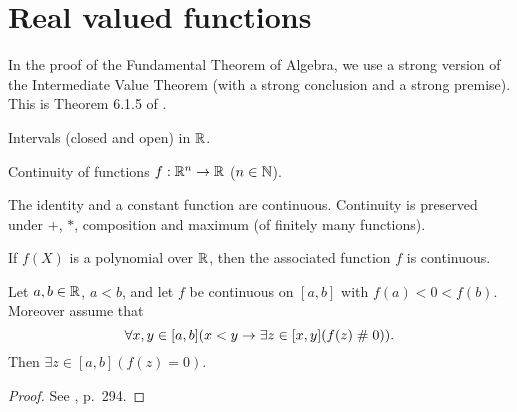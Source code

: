 
\section{Real valued functions}
In the proof of the Fundamental Theorem of Algebra, we use a
strong version of the Intermediate Value Theorem (with a
strong conclusion and a strong premise). This is Theorem 6.1.5 of
\cite{TvD881}.

\begin{definition} Intervals (closed and open) in $\mathbb{R}$.
\end{definition}

\begin{definition} Continuity of functions $f:\mathbb{R}^n\rightarrow \mathbb{R}$
($n\in\mathbb{N}$).
\end{definition}

\begin{lemma}
The identity and a constant function are continuous. 
Continuity is preserved under $+$, $*$, composition and maximum
(of finitely many functions).
\end{lemma}

\begin{corollary} If $f(X)$ is a polynomial over $\mathbb{R}$, then the
associated function $f$ is continuous.
\end{corollary}

\begin{theorem}\label{thmIVT}
Let $a,b\in \mathbb{R}$, $a<b$, and let $f$ be continuous on $[a,b]$ with
$f(a)<0<f(b)$.  Moreover assume that
$$\forall x,y\in [a,b](x<y \rightarrow \exists z\in[x,y] (f(z)\mathrel{\#}
0)).$$
Then $\exists z\in[a,b](f(z)=0)$.
\end{theorem}

\begin{proof}
See \cite{TvD881}, p.\ 294.
\end{proof}


